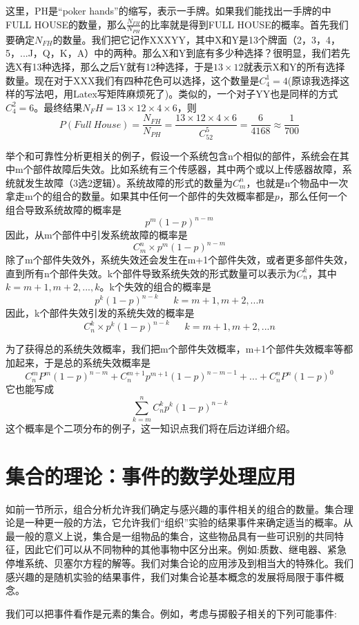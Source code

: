 \documentclass[cn,11pt,chinese]{elegantbook}
\begin{document}
这里，PH是“poker hands”的缩写，表示一手牌。如果我们能找出一手牌的中FULL HOUSE的数量，那么$\frac{N_{FH}}{N_{PH}}$的比率就是得到FULL HOUSE的概率。首先我们要确定$N_{FH}$的数量。我们把它记作XXXYY，其中X和Y是13个牌面（2，3，4，5，...J，Q，K，A）中的两种。那么X和Y到底有多少种选择？很明显，我们若先选X有13种选择，那么之后Y就有12种选择，于是$13\times 12$就表示X和Y的所有选择数量。现在对于XXX我们有四种花色可以选择，这个数量是$C_4^1=4$(原谅我选择这样的写法吧，用Latex写矩阵麻烦死了)。类似的，一个对子YY也是同样的方式$C_4^2=6$。最终结果$N_FH=13\times12\times4\times6$，则
$$
P(Full \ House)=\frac{N_{FH}}{N_{PH}}=\frac{13\times 12\times 4\times 6}{C_{52}^5}=\frac{6}{4168} \approx \frac{1}{700}
$$

举个和可靠性分析更相关的例子，假设一个系统包含n个相似的部件，系统会在其中m个部件故障后失效。比如系统有三个传感器，其中两个或以上传感器故障，系统就发生故障（3选2逻辑）。系统故障的形式的数量为$C_m^n$，也就是n个物品中一次拿走m个的组合的数量。如果其中任何一个部件的失效概率都是$p$，那么任何一个组合导致系统故障的概率是
$$p^m(1-p)^{n-m}$$
因此，从m个部件中引发系统故障的概率是
$$C_m^n\times p^m(1-p)^{n-m}$$
除了m个部件失效外，系统失效还会发生在m+1个部件失效，或者更多部件失效，直到所有n个部件失效。k个部件导致系统失效的形式数量可以表示为$C_n^k$，其中$k=m+1,m+2,...,k$。k个失效的组合的概率是
$$p^k(1-p)^{n-k} \ \ \ \ \ \ \ k=m+1,m+2,...n$$
因此，k个部件失效引发的系统失效的概率是
$$C_n^k \times p^k(1-p)^{n-k} \ \ \ \ \ \ \ k=m+1,m+2,...n$$

为了获得总的系统失效概率，我们把m个部件失效概率，m+1个部件失效概率等都加起来，于是总的系统失效概率是
$$
C_n^mP^m(1-p)^{n-m}+C_n^{m+1}p^{m+1}(1-p)^{n-m-1}+...+C_n^nP^n(1-p)^0
$$
它也能写成
$$\sum_{k=m}^nC_n^kp^k(1-p)^{n-k}$$
这个概率是个二项分布的例子，这一知识点我们将在后边详细介绍。

\section{集合的理论：事件的数学处理应用}

如前一节所示，组合分析允许我们确定与感兴趣的事件相关的组合的数量。集合理论是一种更一般的方法，它允许我们“组织”实验的结果事件来确定适当的概率。从最一般的意义上说，集合是一组物品的集合，这些物品具有一些可识别的共同特征，因此它们可以从不同物种的其他事物中区分出来。例如:质数、继电器、紧急停堆系统、贝塞尔方程的解等。我们对集合论的应用涉及到相当大的特殊化。我们感兴趣的是随机实验的结果事件，我们对集合论基本概念的发展将局限于事件概念。

我们可以把事件看作是元素的集合。例如，考虑与掷骰子相关的下列可能事件:
\end{document}
